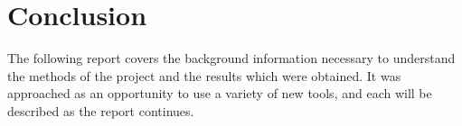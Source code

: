 


\section*{Conclusion}

The following report covers the background information necessary to understand the methods of the project and the results which were obtained.
It was approached as an opportunity to use a variety of new tools, and each will be described as the report continues. %
